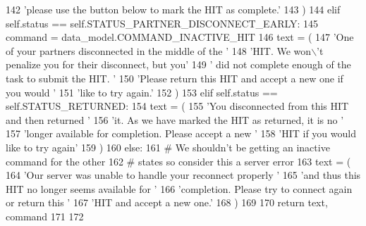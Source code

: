 \begin{DoxyCode}
142                 \textcolor{stringliteral}{'please use the button below to mark the HIT as complete.'}
143             )
144         \textcolor{keywordflow}{elif} self.status == self.STATUS\_PARTNER\_DISCONNECT\_EARLY:
145             command = data\_model.COMMAND\_INACTIVE\_HIT
146             text = (
147                 \textcolor{stringliteral}{'One of your partners disconnected in the middle of the '}
148                 \textcolor{stringliteral}{'HIT. We won\(\backslash\)'t penalize you for their disconnect, but you'}
149                 \textcolor{stringliteral}{' did not complete enough of the task to submit the HIT. '}
150                 \textcolor{stringliteral}{'Please return this HIT and accept a new one if you would '}
151                 \textcolor{stringliteral}{'like to try again.'}
152             )
153         \textcolor{keywordflow}{elif} self.status == self.STATUS\_RETURNED:
154             text = (
155                 \textcolor{stringliteral}{'You disconnected from this HIT and then returned '}
156                 \textcolor{stringliteral}{'it. As we have marked the HIT as returned, it is no '}
157                 \textcolor{stringliteral}{'longer available for completion. Please accept a new '}
158                 \textcolor{stringliteral}{'HIT if you would like to try again'}
159             )
160         \textcolor{keywordflow}{else}:
161             \textcolor{comment}{# We shouldn't be getting an inactive command for the other}
162             \textcolor{comment}{# states so consider this a server error}
163             text = (
164                 \textcolor{stringliteral}{'Our server was unable to handle your reconnect properly '}
165                 \textcolor{stringliteral}{'and thus this HIT no longer seems available for '}
166                 \textcolor{stringliteral}{'completion. Please try to connect again or return this '}
167                 \textcolor{stringliteral}{'HIT and accept a new one.'}
168             )
169 
170         \textcolor{keywordflow}{return} text, command
171 
172 
\end{DoxyCode}
\mbox{\label{classparlai_1_1mturk_1_1core_1_1legacy__2018_1_1agents_1_1AssignState_aa578343eefce8c86ab64ab06430f864b}} 
